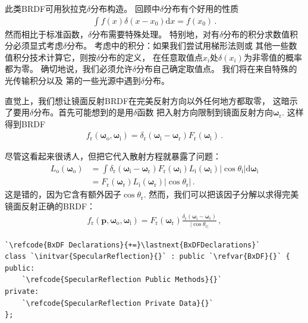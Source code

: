 此类BRDF可用狄拉克$\delta$分布构造。
回顾中$\delta$分布有个好用的性质
\begin{align}\label{eq:8.4}
    \int{f(x)\delta(x-x_0)\mathrm{d}x}=f(x_0)\, .
\end{align}
然而相比于标准函数，$\delta$分布需要特殊处理。
特别地，对有$\delta$分布的积分求数值积分必须显式考虑$\delta$分布。
考虑中的积分：如果我们尝试用梯形法则或
其他一些数值积分技术计算它，则按$\delta$分布的定义，
在任意取值点$x_i$处$\delta(x_i)$为非零值的概率都为零。
确切地说，我们必须允许$\delta$分布自己确定取值点。
我们将在来自特殊的光传输积分以及
第的一些光源中遇到$\delta$分布。

直觉上，我们想让镜面反射BRDF在完美反射方向以外任何地方都取零，
这暗示了要用$\delta$分布。首先可能想到的是用$\delta$函数
把入射方向限制到镜面反射方向${\bm\omega}_{\mathrm{r}}$.
这样得到BRDF
\begin{align*}
    f_{\mathrm{r}}({\bm\omega}_{\mathrm{o}},{\bm\omega}_{\mathrm{i}})=\delta_{\mathrm{r}}({\bm\omega}_{\mathrm{i}}-{\bm\omega}_{\mathrm{r}})F_{\mathrm{r}}({\bm\omega}_{\mathrm{i}})\, .
\end{align*}

尽管这看起来很诱人，但把它代入散射方程就暴露了问题：
\begin{align*}
    L_{\mathrm{o}}({\bm\omega}_{\mathrm{o}}) & =\int{\delta_{\mathrm{r}}({\bm\omega}_{\mathrm{i}}-{\bm\omega}_{\mathrm{r}})F_{\mathrm{r}}({\bm\omega}_{\mathrm{i}})}L_{\mathrm{i}}({\bm\omega}_{\mathrm{i}})|\cos\theta_{\mathrm{i}}|\mathrm{d}{\bm\omega}_{\mathrm{i}} \\
                                             & =F_{\mathrm{r}}({\bm\omega}_{\mathrm{r}})L_{\mathrm{i}}({\bm\omega}_{\mathrm{r}})|\cos\theta_{\mathrm{r}}|\, .
\end{align*}
这是错的，因为它含有额外因子$\cos\theta_{\mathrm{r}}$.
然而，我们可以把该因子分解以求得完美镜面反射正确的BRDF：
\begin{align*}
    f_\mathrm{r}({\bm p},{\bm \omega}_\mathrm{o},{\bm \omega}_\mathrm{i})=F_{\mathrm{r}}({\bm\omega}_{\mathrm{r}})\frac{\delta_{\mathrm{r}}({\bm\omega}_{\mathrm{i}}-{\bm\omega}_{\mathrm{r}})}{|\cos\theta_{\mathrm{r}|}}\, ,
\end{align*}
\begin{lstlisting}
`\refcode{BxDF Declarations}{+=}\lastnext{BxDFDeclarations}`
class `\initvar{SpecularReflection}{}` : public `\refvar{BxDF}{}` {
public:
    `\refcode{SpecularReflection Public Methods}{}`
private:
    `\refcode{SpecularReflection Private Data}{}`
};
\end{lstlisting}

